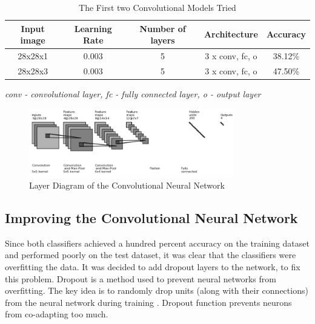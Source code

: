 \begin{table}[h]
\begin{center}
\begin{tabular}{ |c|c|c|c|c| }
\hline
 Input image&Learning Rate &   Number of layers & Architecture & Accuracy \\   \hline
28x28x1 & 0.003   &   5  &  3 x conv, fc, o  & 38.12\% \\
28x28x3 & 0.003   &   5  &  3 x conv, fc, o  & 47.50\% \\
 \hline
\end{tabular}
\caption{The First two Convolutional Models Tried}

\label{table:convi}
\textit{ conv - convolutional layer, fc - fully connected layer, o - output layer}
\end{center}
\end{table}


\begin{figure}[h]
\centering
\includegraphics[width=0.8\textwidth]{Figures/4/conv_diagram.PNG}
\caption{Layer Diagram  of the  Convolutional Neural Network }
\label{fig:conv2}
\end{figure}


\subsection{Improving the Convolutional Neural Network}

Since both classifiers achieved a hundred percent accuracy on the training dataset and performed poorly on the test dataset, it was clear that the classifiers were overfitting the data. It was decided to add dropout layers to the network, to fix this problem. Dropout is a method used to prevent neural networks from overfitting. The key idea is to randomly drop units (along with their connections) from the neural network during training \citep{dropout}. Dropout function prevents neurons from co-adapting too much. 

